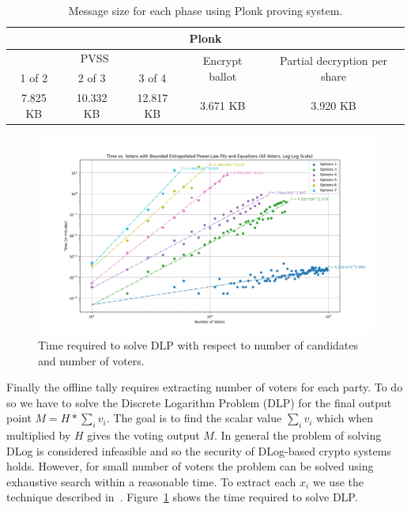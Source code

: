 \documentclass{article}
\begin{document}
\begin{table}
\centering
\label{table:plonk-size}
\caption{Message size for each phase using Plonk proving system.}
\begin{tabular}{|c|c|c|c|c|}
    \hline
    \multicolumn{5}{|c|}{Plonk} \\
    \hline
    \multicolumn{3}{|c|}{PVSS} & \multirow{2}{*}{Encrypt ballot} & \multirow{2}{*}{Partial decryption per share} \\
    \cline{1-3}
    1 of 2 & 2 of 3 & 3 of 4 & & \\
    \hline
    7.825 KB& 10.332 KB & 12.817 KB & 3.671 KB & 3.920 KB\\
    \hline
\end{tabular}
\end{table}

\begin{figure}
    \centering
    \includegraphics[width=\textwidth]{dlog-search-time.png}
    \caption{Time required to solve DLP with respect to number of candidates and number of voters.}
    \label{fig:dlog-search}
\end{figure}
Finally the offline tally requires extracting number of voters for each party. To do so we have to solve the Discrete Logarithm Problem (DLP) for the final output point $M = H * \sum_i v_i$. The goal is to find the scalar value $\sum_i v_i$ which when multiplied by $H$ gives the voting output $M$. In general the problem of solving DLog is considered infeasible and so the security of DLog-based crypto systems holds. However, for small number of voters the problem can be solved using exhaustive search within a reasonable time. To extract each $x_i$ we use the technique described in~\cite{haoAnonymousVotingTworound2010}. Figure~\ref{fig:dlog-search} shows the time required to solve DLP.
\end{document}

